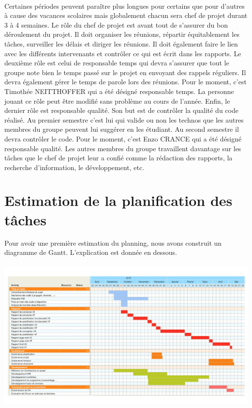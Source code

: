 \paragraph{}
Certaines périodes peuvent paraître plus longues pour certains que pour d’autres à cause des vacances
scolaires mais globalement chacun sera chef de projet durant 3 à 4 semaines. Le rôle du chef de projet est
avant tout de s’assurer du bon déroulement du projet. Il doit organiser les réunions, répartir équitablement
les tâches, surveiller les délais et diriger les réunions. Il doit également faire le lien avec les
différents intervenants et contrôler ce qui est écrit dans les rapports. Le deuxième rôle est celui de
responsable temps qui devra s’assurer que tout le groupe note bien le temps passé sur le projet en envoyant
des rappels réguliers. Il devra également gérer le temps de parole lors des réunions. Pour le moment,
c’est Timothée NEITTHOFFER qui a été désigné responsable temps. La personne jouant ce rôle peut être
modifié sans problème au cours de l’année. Enfin, le dernier rôle est responsable qualité. Son but est de
contrôler la qualité du code réalisé. Au premier semestre c’est lui qui valide ou non les technos que les
autres membres du groupe peuvent lui suggérer en les étudiant. Au second semestre il devra contrôler le code.
Pour le moment, c’est Enzo CRANCE qui a été désigné responsable qualité. Les autres membres du groupe travaillent
davantage sur les tâches que le chef de projet leur a confié comme la rédaction des rapports, la
recherche d’information, le développement, etc.

\section{Estimation de la planification des tâches}

Pour avoir une première estimation du planning, nous avons construit un diagramme de Gantt. L’explication est donnée en dessous.

\paragraph{}
\begin{mdframed}[frametitle={Estimation de la planification des tâches}, innerbottommargin=10]
\begin{center}
\includegraphics[width=\linewidth]{gantt.pdf}
\end{center}
\end{mdframed}

